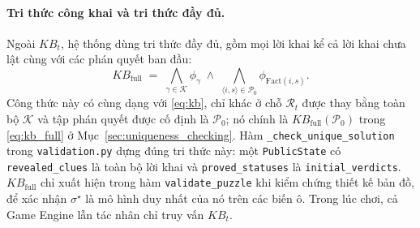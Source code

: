 \paragraph{Tri thức công khai và tri thức đầy đủ.}
Ngoài $\mathit{KB}_t$, hệ thống dùng tri thức đầy đủ, gồm mọi lời khai kể cả
lời khai chưa lật cùng với các phán quyết ban đầu:
\begin{equation}
  \mathit{KB}_{\mathrm{full}} \;=\;
  \bigwedge_{\gamma \in \mathcal{K}} \phi_\gamma
  \;\land\;
  \bigwedge_{\langle i, s\rangle \in \mathcal{P}_0} \phi_{\mathrm{Fact}(i,s)} .
  \label{eq:kb_full_def}
\end{equation}
Công thức này có cùng dạng với \eqref{eq:kb}, chỉ khác ở chỗ $\mathcal{R}_t$
được thay bằng toàn bộ $\mathcal{K}$ và tập phán quyết được cố định là
$\mathcal{P}_0$; nó chính là $\mathit{KB}_{\mathrm{full}}(\mathcal{P}_0)$ trong
\eqref{eq:kb_full} ở Mục~\ref{sec:uniqueness_checking}. Hàm
\texttt{\_check\_unique\_solution} trong \texttt{validation.py} dựng đúng tri
thức này: một \texttt{PublicState} có \texttt{revealed\_clues} là toàn bộ lời
khai và \texttt{proved\_statuses} là \texttt{initial\_verdicts}.
$\mathit{KB}_{\mathrm{full}}$ chỉ xuất hiện trong hàm \texttt{validate\_puzzle}
khi kiểm chứng thiết kế bản đồ, để xác nhận $\sigma^\star$ là mô hình duy nhất
của nó trên các biến ô. Trong lúc chơi, cả Game Engine lẫn tác nhân chỉ truy
vấn $\mathit{KB}_t$.
